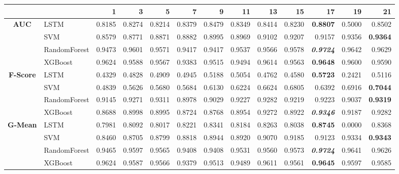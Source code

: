 \begin{table}[H]
	\centering
	\begin{adjustbox}{max width=14cm}
		\begin{tabular}{|c|l|r|r|r|r|r|r|r|r|r|r|r|}
			\hline
			&         &      1  &      3  &      5  &      7  &      9  &      11 &      13 &      15 &      17 &      19 &      21 \\
			\hline
			\textbf{AUC} &  LSTM &  0.8185 &  0.8274 &  0.8214 &  0.8379 &  0.8479 &  0.8349 &  0.8414 &  0.8230 & \textbf{  0.8807 } &  0.5000 &  0.8502 \\
			&  SVM &  0.8579 &  0.8771 &  0.8871 &  0.8882 &  0.8995 &  0.8969 &  0.9102 &  0.9207 &  0.9157 &  0.9356 & \textbf{  0.9364 } \\
			&  RandomForest &  0.9473 &  0.9601 &  0.9571 &  0.9417 &  0.9417 &  0.9537 &  0.9566 &  0.9578 & \textit{ \textbf{  0.9724 } } &  0.9642 &  0.9629 \\
			&  XGBoost &  0.9624 &  0.9588 &  0.9567 &  0.9383 &  0.9515 &  0.9494 &  0.9614 &  0.9563 & \textbf{  0.9648 } &  0.9600 &  0.9590 \\
			\hline
			\textbf{F-Score} &  LSTM &  0.4329 &  0.4828 &  0.4909 &  0.4945 &  0.5188 &  0.5054 &  0.4762 &  0.4580 & \textbf{  0.5723 } &  0.2421 &  0.5116 \\
			&  SVM &  0.4839 &  0.5626 &  0.5680 &  0.5684 &  0.6130 &  0.6224 &  0.6624 &  0.6805 &  0.6392 &  0.6916 & \textbf{  0.7044 } \\
			&  RandomForest &  0.9145 &  0.9271 &  0.9311 &  0.8978 &  0.9029 &  0.9227 &  0.9282 &  0.9219 &  0.9223 &  0.9037 & \textbf{  0.9319 } \\
			&  XGBoost &  0.8688 &  0.8998 &  0.8995 &  0.8724 &  0.8768 &  0.8954 &  0.9272 &  0.8922 & \textit{ \textbf{  0.9346 } } &  0.9187 &  0.9282 \\
			\hline
			\textbf{G-Mean} &  LSTM &  0.7981 &  0.8092 &  0.8017 &  0.8221 &  0.8341 &  0.8184 &  0.8263 &  0.8038 & \textbf{  0.8745 } &  0.0000 &  0.8368 \\
			&  SVM &  0.8460 &  0.8705 &  0.8799 &  0.8818 &  0.8944 &  0.8920 &  0.9070 &  0.9185 &  0.9123 &  0.9334 & \textbf{  0.9343 } \\
			&  RandomForest &  0.9465 &  0.9597 &  0.9565 &  0.9408 &  0.9408 &  0.9531 &  0.9560 &  0.9573 & \textit{ \textbf{  0.9724 } } &  0.9641 &  0.9626 \\
			&  XGBoost &  0.9624 &  0.9587 &  0.9566 &  0.9379 &  0.9513 &  0.9489 &  0.9611 &  0.9561 & \textbf{  0.9645 } &  0.9597 &  0.9585 \\

\end{tabular}
\end{adjustbox}
\end{table}
